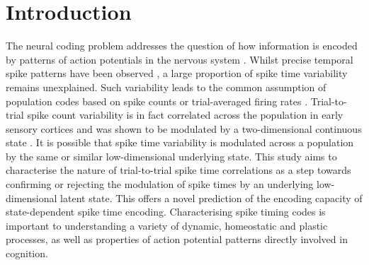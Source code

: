 \documentclass{article}
\begin{document}
\section{Introduction}
The neural coding problem addresses the question of how information is encoded by patterns of action potentials in the nervous system \cite{gerstner1997neural, johnson2000neural, stein2005neuronal, gerstner2014neuronal}. Whilst precise temporal spike patterns have been observed \cite{uzzell2004precision, johansson2004first, gollisch2008rapid, storchi2012comparison, reinagel2002precise, reyes2014laminar}, a large proportion of spike time variability remains unexplained. Such variability leads to the common assumption of population codes based on spike counts \cite{reyes2015high, lin2015nature} or trial-averaged firing rates \cite{hong2016explicit, chang2017code, kar2019evidence, stringer2019high}.
Trial-to-trial spike count variability is in fact correlated across the population in early sensory cortices \cite{reyes2015high, lin2015nature} and was shown to be modulated by a two-dimensional continuous state \cite{lin2015nature}. It is possible that spike time variability is modulated across a population by the same or similar low-dimensional underlying state. This study aims to characterise the nature of trial-to-trial spike time correlations as a step towards confirming or rejecting the modulation of spike times by an underlying low-dimensional latent state. This offers a novel prediction of the encoding capacity of state-dependent spike time encoding. Characterising spike timing codes is important to understanding a variety of dynamic, homeostatic and plastic processes, as well as properties of action potential patterns directly involved in cognition.


\end{document}
